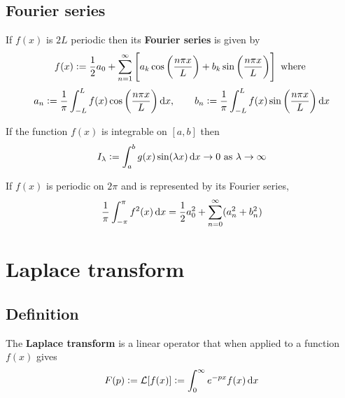 \documentclass[../Year1/Year1.tex]{subfiles}
\begin{document}
\subsection{Fourier series}
\begin{definition}
    If $f(x)$ is $2L$ periodic then its \textbf{Fourier series} is given by \[
        f(x) := \frac{1}{2}a_0 + \sum_{n=1}^\infty\left[a_k\cos\br{\frac{n\pi x}{L}}+b_k\sin\br{\frac{n\pi x}{L}}\right] \ \text{\textcolor{black}{where }}\]\[ a_n := \frac{1}{\pi}\intd{-L}{L}{f(x)\cos\br{\frac{n\pi x}{L}}}{x}, \qquad b_n := \frac{1}{\pi}\intd{-L}{L}{f(x)\sin\br{\frac{n\pi x}{L}}}{x}
    \]
    
\end{definition}

\begin{lemma}
    If the function $f(x)$ is integrable on $[a,b]$ then \[
        I_\lambda := \intd{a}{b}{g(x)\sin(\lambda x)}{x}\rightarrow 0 \ \text{\textcolor{black}{as }}\lambda\rightarrow\infty
    \]
\end{lemma}

\begin{theorem}[Paerseval's]
    If $f(x)$ is periodic on $2\pi$ and is represented by its Fourier series, \[
        \frac{1}{\pi}\intd{-\pi}{\pi}{f^2(x)}{x} = \frac{1}{2}a_0^2 + \sum_{n=0}^\infty(a_n^2+b_n^2)
    \]
\end{theorem}

\section{Laplace transform}

\subsection{Definition}

\begin{definition}
    The \textbf{Laplace transform} is a linear operator that when applied to a function $f(x)$ gives \[
        F(p) := \LLL[f(x)] := \intd{0}{\infty}{e^{-px}f(x)}{x}
    \]
\end{definition}
\end{document}
